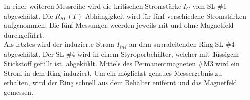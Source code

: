 In einer weiteren Messreihe wird die kritischen Stromstärke $I_C$ vom SL \#1 abgesch\"atzt.
Die $R_{SL}(T)$ Abhängigkeit wird f\"ur fünf verschiedene Stromstärken aufgenommen.
Die f\"unf Messungen weerden jeweils mit und ohne Magnetfeld durchgef\"uhrt. \\


Als letztes wird der induzierte Strom $I_{ind}$ an dem supraleitenden Ring SL \#4 abgesch\"atzt.
Der SL \#4 wird in einem Styroporbehälter, welcher mit fl\"ussigem Stickstoff gef\"ullt ist, abgek\"uhlt.
Mittels des Permanentmagneten \#M3 wird ein Strom in dem Ring induziert.
Um ein m\"oglichst genaues Messergebnis zu erhalten, wird der Ring schnell aus dem Behälter entfernt und das Magnetfeld gemessen.
